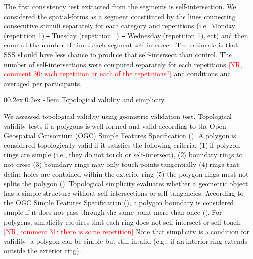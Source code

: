 \documentclass[
  man,
  longtable,
  a4paper,
  nolmodern,
  notxfonts,
  notimes,
  colorlinks=true,linkcolor=blue,citecolor=blue,urlcolor=blue]{apa7}
\makeatletter
\renewcommand{\paragraph}{\@startsection{paragraph}{4}{\parindent}%
	{0\baselineskip \@plus 0.2ex \@minus 0.2ex}%
	{-.5em}%
	{\normalfont\normalsize\bfseries\typesectitle}}
\makeatother
\begin{document}
The first consistency test extracted from the segments is
self-intersection. We considered the spatial-forms as a segment
constituted by the lines connecting consecutive stimuli separately for
each category and repetitions (i.e.~Monday (repetition 1) \texttt{→}
Tuesday (repetition 1) \texttt{→} Wednesday (repetition 1), ect) and
then counted the number of times each segment self-intersect. The
rationale is that SSS should have less chance to produce that
self-intersect than control. The number of self-intersections were
computed separately for each repetitions
\textcolor{red}{[NR, comment 30: each repetition or each of the repetitions?]}
and conditions and averaged per participants.

\paragraph{Topological validity and
simplicity.}\label{topological-validity-and-simplicity}

We assessed topological validity using geometric validation test.
Topological validity tests if a polygons is well-formed and valid
according to the Open Geospatial Consortium (OGC) Simple Features
Specification (). A polygon is
considered topologically valid if it satisfies the following criteria:
(1) if polygon rings are simple (i.e., they do not touch or
self-intersect), (2) boundary rings to not cross (3) boundary rings may
only touch points tangentially (4) rings that define holes are contained
within the exterior ring (5) the polygon rings must not splits the
polygon ().
Topological simplicity evaluates whether a geometric object has a simple
structure without self-intersections or self-tangencies. According to
the OGC Simple Features Specification
(), a polygon boundary is
considered simple if it does not pass through the same point more than
once (). For
polygons, simplicity requires that each ring does not self-intersect or
self-touch. \textcolor{red}{[NR, comment 31: there is some repetition]}
Note that simplicity is a condition for validity: a polygon can be
simple but still invalid (e.g., if an interior ring extends outside the
exterior ring).
\end{document}
